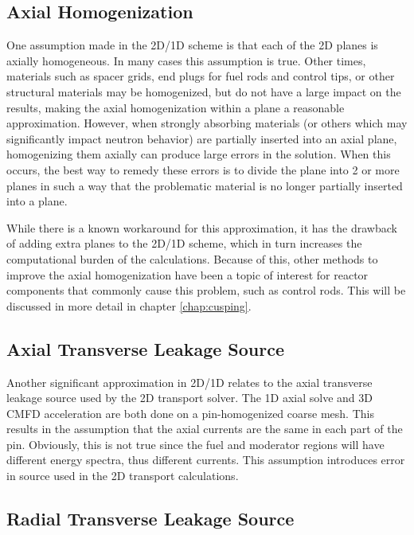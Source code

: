 \subsection{Axial Homogenization}

One assumption made in the 2D/1D scheme is that each of the 2D planes is axially homogeneous.  In many cases this assumption is true.  Other times, materials such as spacer grids, end plugs for fuel rods and control tips, or other structural materials may be homogenized, but do not have a large impact on the results, making the axial homogenization within a plane a reasonable approximation.  However, when strongly absorbing materials (or others which may significantly impact neutron behavior) are partially inserted into an axial plane, homogenizing them axially can produce large errors in the solution.  When this occurs, the best way to remedy these errors is to divide the plane into 2 or more planes in such a way that the problematic material is no longer partially inserted into a plane.

While there is a known workaround for this approximation, it has the drawback of adding extra planes to the 2D/1D scheme, which in turn increases the computational burden of the calculations.  Because of this, other methods to improve the axial homogenization have been a topic of interest for reactor components that commonly cause this problem, such as control rods.  This will be discussed in more detail in chapter \ref{chap:cusping}.

\subsection{Axial Transverse Leakage Source}

Another significant approximation in 2D/1D relates to the axial transverse leakage source used by the 2D transport solver.  The 1D axial solve and 3D CMFD acceleration are both done on a pin-homogenized coarse mesh.  This results in the assumption that the axial currents are the same in each part of the pin.  Obviously, this is not true since the fuel and moderator regions will have different energy spectra, thus different currents.  This assumption introduces error in source used in the 2D transport calculations.

\subsection{Radial Transverse Leakage Source}